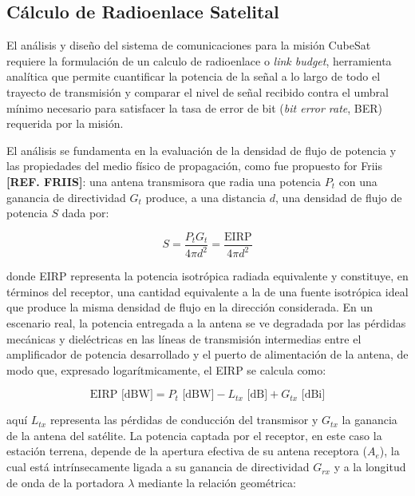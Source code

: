 \subsection{Cálculo de Radioenlace Satelital} \label{sec:radioenlace}
El análisis y diseño del sistema de comunicaciones para la misión CubeSat requiere la formulación de un calculo de radioenlace o \textit{link budget}, herramienta analítica que permite cuantificar la potencia de la señal a lo largo de todo el trayecto de transmisión y comparar el nivel de señal recibido contra el umbral mínimo necesario para satisfacer la tasa de error de bit (\textit{bit error rate}, BER) requerida por la misión.

El análisis se fundamenta en la evaluación de la densidad de flujo de potencia y las propiedades del medio físico de propagación, como fue propuesto for Friis \textbf{[REF. FRIIS]}: una antena transmisora que radia una potencia $P_t$ con una ganancia de directividad $G_t$ produce, a una distancia $d$, una densidad de flujo de potencia $S$ dada por:

\begin{equation}
    S = \frac{P_t G_t}{4\pi d^2} = \frac{\text{EIRP}}{4\pi d^2}
    \label{eq:densidad_flujo}
\end{equation}

donde EIRP representa la potencia isotrópica radiada equivalente y constituye, en términos del receptor, una cantidad equivalente a la de una fuente isotrópica ideal que produce la misma densidad de flujo en la dirección considerada. En un escenario real, la potencia entregada a la antena se ve degradada por las pérdidas mecánicas y dieléctricas en las líneas de transmisión intermedias entre el amplificador de potencia desarrollado y el puerto de alimentación de la antena, de modo que, expresado logarítmicamente, el EIRP se calcula como:

\begin{equation}
    \text{EIRP [dBW]} = P_t \text{ [dBW]} - L_{tx} \text{ [dB]} + G_{tx} \text{ [dBi]}
    \label{eq:eirp_analitico}
\end{equation}

aquí $L_{tx}$ representa las pérdidas de conducción del transmisor y $G_{tx}$ la ganancia de la antena del satélite. La potencia captada por el receptor, en este caso la estación terrena, depende de la apertura efectiva de su antena receptora ($A_e$), la cual está intrínsecamente ligada a su ganancia de directividad $G_{rx}$ y a la longitud de onda de la portadora $\lambda$ mediante la relación geométrica: 


